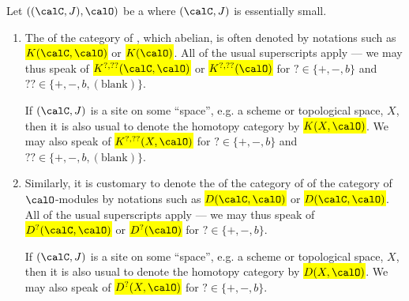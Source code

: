 \begin{notation} \label{notation:notations_for_homotopy_and_derived_categories_of_sheaves_of_modules_on_a_ringed_site}
    Let $((\calC,J), \calO)$ be a  where $(\calC, J)$ is essentially small. 
    
    \begin{enumerate}
        \item The  of the category of , which  abelian, is often denoted by notations such as \hl{$K(\calC, \calO)$} or \hl{$K(\calO)$}. All of the usual superscripts apply --- we may thus speak of \hl{$K^{?,??}(\calC, \calO)$} or \hl{$K^{?,??}(\calO)$} for $? \in \{+,-,b\}$ and $?? \in \{+,-,b,(\text{blank})\}$. 
        
        If $(\calC, J)$ is a site on some ``space'', e.g. a scheme or topological space, $X$, then it is also usual to denote the homotopy category by \hl{$K(X, \calO)$}. We may also speak of \hl{$K^{?,??}(X, \calO)$} for $? \in \{+,-,b\}$ and $?? \in \{+,-,b,(\text{blank})\}$. 


        \item Similarly, it is customary to denote the  of the category of  of the category of $\calO$-modules by notations such as \hl{$D(\calC,\calO)$} or \hl{$D(\calC,\calO)$}. All of the usual superscripts apply --- we may thus speak of \hl{$D^{?}(\calC, \calO)$} or \hl{$D^{?}(\calO)$} for $? \in \{+,-,b\}$. 


        If $(\calC, J)$ is a site on some ``space'', e.g. a scheme or topological space, $X$, then it is also usual to denote the homotopy category by \hl{$D(X, \calO)$}. We may also speak of \hl{$D^{?}(X, \calO)$} for $? \in \{+,-,b\}$. 
    \end{enumerate}

\end{notation}